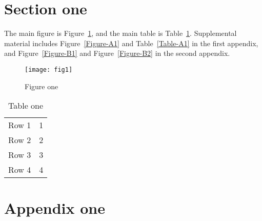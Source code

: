 \documentclass{article}
\begin{document}
\section{Section one}

The main figure is Figure~\ref{Figure-1}, and the main table is Table~\ref{Table-1}. Supplemental material 
includes Figure~\ref{Figure-A1} and Table~\ref{Table-A1} in the first appendix, and Figure~\ref{Figure-B1} 
and Figure~\ref{Figure-B2} in the second appendix.

\begin{figure}
    \texttt{[image: fig1]}
\caption{Figure one} \label{Figure-1}
\end{figure}

\begin{table}
    \begin{tabular}{ll}
        Row 1 & 1\\
        Row 2 & 2\\
        Row 3 & 3\\
        Row 4 & 4\\
    \end{tabular}
\caption{Table one}\label{Table-1}
\end{table}

\appendix

\makeatletter
\renewcommand{\thepostfigure}{\Alph{section}.\arabic{postfigure}}
\setcounter{postfigure}{0}
\renewcommand{\theposttable}{\Alph{section}.\arabic{posttable}}
\setcounter{posttable}{0}
\makeatother

\section{Appendix one}
\end{document}

